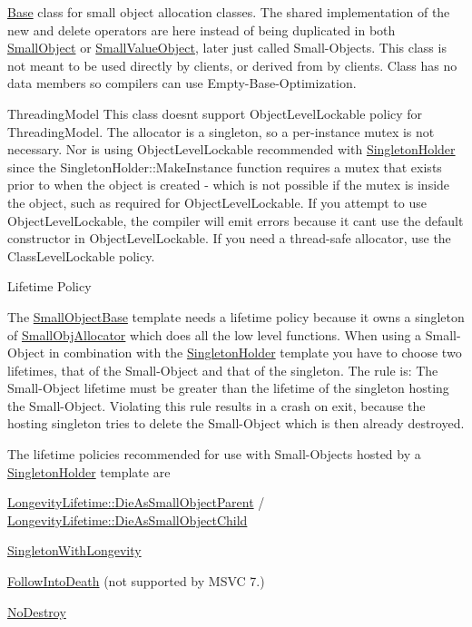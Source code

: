 \hyperlink{structBase}{Base} class for small object allocation classes. The shared implementation of the new and delete operators are here instead of being duplicated in both \hyperlink{classLoki_1_1SmallObject}{Small\+Object} or \hyperlink{classLoki_1_1SmallValueObject}{Small\+Value\+Object}, later just called Small-\/\+Objects. This class is not meant to be used directly by clients, or derived from by clients. Class has no data members so compilers can use Empty-\/\+Base-\/\+Optimization.

\begin{DoxyParagraph}{Threading\+Model}
This class doesn\textquotesingle{}t support Object\+Level\+Lockable policy for Threading\+Model. The allocator is a singleton, so a per-\/instance mutex is not necessary. Nor is using Object\+Level\+Lockable recommended with \hyperlink{classLoki_1_1SingletonHolder}{Singleton\+Holder} since the Singleton\+Holder\+::\+Make\+Instance function requires a mutex that exists prior to when the object is created -\/ which is not possible if the mutex is inside the object, such as required for Object\+Level\+Lockable. If you attempt to use Object\+Level\+Lockable, the compiler will emit errors because it can\textquotesingle{}t use the default constructor in Object\+Level\+Lockable. If you need a thread-\/safe allocator, use the Class\+Level\+Lockable policy.
\end{DoxyParagraph}
\begin{DoxyParagraph}{Lifetime Policy}

\end{DoxyParagraph}
The \hyperlink{classLoki_1_1SmallObjectBase}{Small\+Object\+Base} template needs a lifetime policy because it owns a singleton of \hyperlink{classLoki_1_1SmallObjAllocator}{Small\+Obj\+Allocator} which does all the low level functions. When using a Small-\/\+Object in combination with the \hyperlink{classLoki_1_1SingletonHolder}{Singleton\+Holder} template you have to choose two lifetimes, that of the Small-\/\+Object and that of the singleton. The rule is\+: The Small-\/\+Object lifetime must be greater than the lifetime of the singleton hosting the Small-\/\+Object. Violating this rule results in a crash on exit, because the hosting singleton tries to delete the Small-\/\+Object which is then already destroyed.

The lifetime policies recommended for use with Small-\/\+Objects hosted by a \hyperlink{classLoki_1_1SingletonHolder}{Singleton\+Holder} template are
\begin{DoxyItemize}
\item \hyperlink{structLoki_1_1LongevityLifetime_1_1DieAsSmallObjectParent}{Longevity\+Lifetime\+::\+Die\+As\+Small\+Object\+Parent} / \hyperlink{structLoki_1_1LongevityLifetime_1_1DieAsSmallObjectChild}{Longevity\+Lifetime\+::\+Die\+As\+Small\+Object\+Child}
\item \hyperlink{classLoki_1_1SingletonWithLongevity}{Singleton\+With\+Longevity}
\item \hyperlink{classLoki_1_1FollowIntoDeath}{Follow\+Into\+Death} (not supported by M\+S\+V\+C 7.)
\item \hyperlink{structLoki_1_1NoDestroy}{No\+Destroy}
\end{DoxyItemize}

